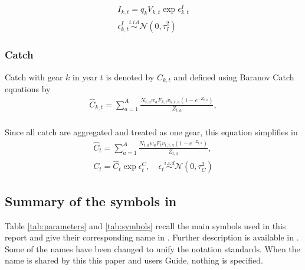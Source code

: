  
\begin{gather}
I_{k,t} = q_k V_{k,t} \exp{\epsilon_{k,t}^I}\\
\epsilon_{k,t}^I \overset{i.i.d}{\sim} \mathcal{N}(0,\tau_I^2)\nonumber
\end{gather}
\subsubsection{Catch}
Catch  with  gear  $k$  in  year  $t$  is  denoted  by  $C_{k,t}$  and
defined using Baranov Catch equations by
\begin{gather*}
\hat{C}_{k,t}   =   \sum_{a=1}^A   \frac{N_{t,a}   w_a   F_{k,t}   v_{k,t,a}
  (1-e^{-Z_{t,a}}) }{Z_{t,a}},\\
\end{gather*}

Since all catch are aggregated and treated as one gear, this equation simplifies in 
\begin{gather}
\hat{C}_{t}   =   \sum_{a=1}^A   \frac{N_{t,a}   w_a   F_{t}   v_{1,t,a}
  (1-e^{-Z_{t,a}}) }{Z_{t,a}},\\
C_{t} = \hat{C}_{t} \exp{\epsilon_{t}^C}, \quad \epsilon_{t}\overset{i.i.d}{\sim}\mathcal{N}(0, \tau^2_C)\nonumber
\end{gather}

\subsection{Summary of the symbols in \iscam}

Table  \ref{tab:parameters}  and  \ref{tab:symbols}  recall  the  main
symbols used in this report and give their corresponding name in \iscam. Further 
description is available  in \cite{Martell11}. Some of  the names have
been changed to unify the notation  standards. When the name is shared by this
 this paper and \iscam users Guide, nothing is specified.


